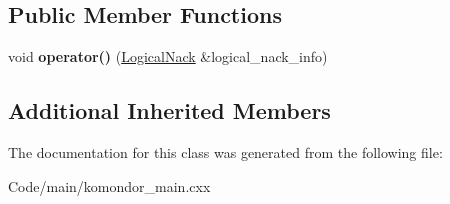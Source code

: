 \subsection*{Public Member Functions}
\begin{DoxyCompactItemize}
\item 
\mbox{\label{classcompcxx__Node__23_1_1my__Node__outportSendLogicalNack__f__t_a702403ff5cc0a1eb3ecc3d0f71adb3a0}} 
void {\bfseries operator()} (\hyperlink{structLogicalNack}{Logical\+Nack} \&logical\+\_\+nack\+\_\+info)
\end{DoxyCompactItemize}
\subsection*{Additional Inherited Members}


The documentation for this class was generated from the following file\+:\begin{DoxyCompactItemize}
\item 
Code/main/komondor\+\_\+main.\+cxx\end{DoxyCompactItemize}
